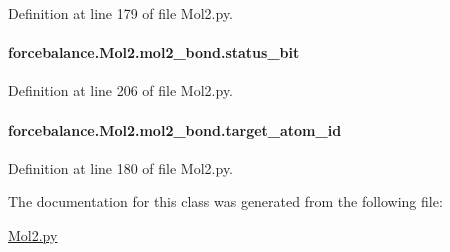 Definition at line 179 of file Mol2.\-py.

\hypertarget{classforcebalance_1_1Mol2_1_1mol2__bond_a0362163c09f7a0fbf65f36fe547535e9}{
\paragraph[{status\-\_\-bit}]{\setlength{\rightskip}{0pt plus 5cm}forcebalance.\-Mol2.\-mol2\-\_\-bond.\-status\-\_\-bit}}\label{classforcebalance_1_1Mol2_1_1mol2__bond_a0362163c09f7a0fbf65f36fe547535e9}


Definition at line 206 of file Mol2.\-py.

\hypertarget{classforcebalance_1_1Mol2_1_1mol2__bond_a6889a23790bd2b0ab5acc4c1143c565e}{
\paragraph[{target\-\_\-atom\-\_\-id}]{\setlength{\rightskip}{0pt plus 5cm}forcebalance.\-Mol2.\-mol2\-\_\-bond.\-target\-\_\-atom\-\_\-id}}\label{classforcebalance_1_1Mol2_1_1mol2__bond_a6889a23790bd2b0ab5acc4c1143c565e}


Definition at line 180 of file Mol2.\-py.



The documentation for this class was generated from the following file\-:\begin{DoxyCompactItemize}
\item 
\hyperlink{Mol2_8py}{Mol2.\-py}\end{DoxyCompactItemize}
